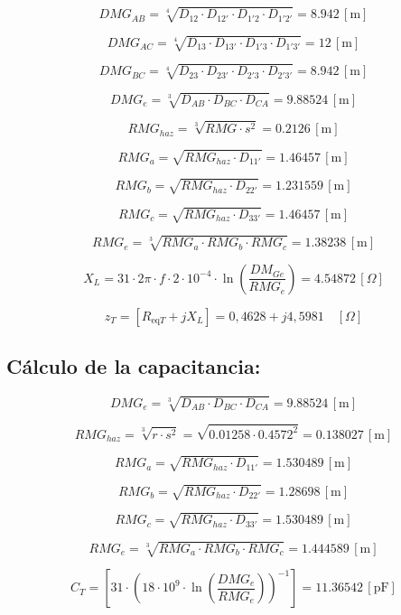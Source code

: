 \[
DMG_{AB} = \sqrt[4]{D_{12} \cdot D_{12'} \cdot D_{1'2} \cdot D_{1'2'}} = 8.942 \, [\text{m}]
\]

\[
DMG_{AC} = \sqrt[4]{D_{13} \cdot D_{13'} \cdot D_{1'3} \cdot D_{1'3'}} = 12 \, [\text{m}]
\]

\[
DMG_{BC} = \sqrt[4]{D_{23} \cdot D_{23'} \cdot D_{2'3} \cdot D_{2'3'}} = 8.942 \, [\text{m}]
\]

\[
DMG_{e} = \sqrt[3]{D_{AB} \cdot D_{BC} \cdot D_{CA}} = 9.88524 \, [\text{m}]
\]

\vspace{0.3cm}
\[
RMG_{haz} = \sqrt[3]{RMG \cdot s^2} = 0.2126 \, [\text{m}]
\]

\[
RMG_{a} = \sqrt{RMG_{haz} \cdot D_{11'}} = 1.46457 \, [\text{m}]
\]

\[
RMG_{b} = \sqrt{RMG_{haz} \cdot D_{22'}} = 1.231559 \, [\text{m}]
\]

\[
RMG_{c} = \sqrt{RMG_{haz} \cdot D_{33'}} = 1.46457 \, [\text{m}]
\]

\[
RMG_{e} = \sqrt[3]{RMG_{a} \cdot RMG_{b} \cdot RMG_{c}} = 1.38238 \, [\text{m}]
\]

\vspace{0.3cm}
\[
X_L = 31\cdot 2\pi \cdot f \cdot2\cdot 10^{-4} \cdot \ln\left( \frac{DM_{Ge}}{RMG_e} \right) = 4.54872 \, [\Omega]
\]

\[
z_T = \left[ R_{\text{eq}T} + jX_L \right] = 0,\!4628 + j4,\!5981 \quad [\Omega]
\]

\subsection*{Cálculo de la capacitancia:}

\[
DMG_{e} = \sqrt[3]{D_{AB} \cdot D_{BC} \cdot D_{CA}} = 9.88524 \, [\text{m}]
\]

\[
RMG_{haz} = \sqrt[3]{r \cdot s^2} = \sqrt{0.01258 \cdot 0.4572^2} = 0.138027 \, [\text{m}]
\]

\[
RMG_{a} = \sqrt{RMG_{haz} \cdot D_{11'}} =   1.530489 \, [\text{m}]
\]

\[
RMG_{b} = \sqrt{RMG_{haz} \cdot D_{22'}} = 1.28698 \, [\text{m}]
\]

\[
RMG_{c} = \sqrt{RMG_{haz} \cdot D_{33'}} = 1.530489 \, [\text{m}]
\]

\[
RMG_{e} = \sqrt[3]{RMG_{a} \cdot RMG_{b} \cdot RMG_{c}} = 1.444589 \, [\text{m}]
\]

\[
C_T = \left[ 31 \cdot \left(18 \cdot 10^9 \cdot \ln\left( \frac{DMG_e}{RMG_e} \right) \right)^{-1} \right] = 11.36542 \, [\text{pF}]
\]

